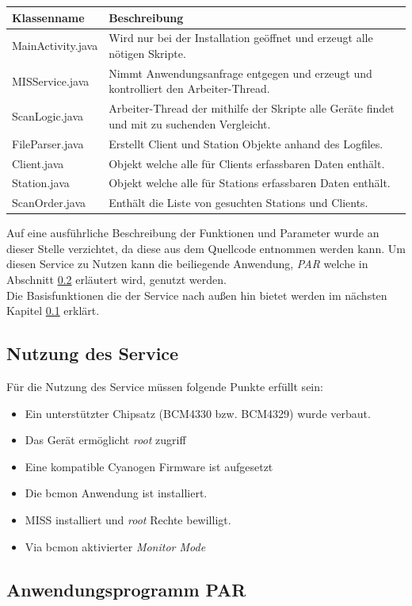 \documentclass[]{report}
\begin{document}
\begin{center}
  \begin{tabulary}{\textwidth}{l | L}
  \toprule
  Klassenname & Beschreibung \\
  \midrule
  MainActivity.java & Wird nur bei der Installation geöffnet und erzeugt alle nötigen Skripte.\\
  MISService.java & Nimmt Anwendungsanfrage entgegen und erzeugt und kontrolliert den Arbeiter-Thread. \\
  ScanLogic.java & Arbeiter-Thread der mithilfe der Skripte alle Geräte findet und mit zu suchenden Vergleicht. \\
  FileParser.java & Erstellt Client und Station Objekte anhand des Logfiles. \\
  Client.java & Objekt welche alle für Clients erfassbaren Daten enthält. \\
  Station.java & Objekt welche alle für Stations erfassbaren Daten enthält. \\ 
  ScanOrder.java & Enthält die Liste von gesuchten Stations und Clients. \\
  \bottomrule
  \end{tabulary}  
\end{center}
Auf eine ausführliche Beschreibung der Funktionen und Parameter wurde an dieser Stelle verzichtet, da diese aus dem Quellcode entnommen werden kann. Um diesen Service zu Nutzen kann die beiliegende Anwendung, \textit{PAR} welche in Abschnitt \ref{lab:par} erläutert wird, genutzt werden. \\
Die Basisfunktionen die der Service nach außen hin bietet werden im nächsten Kapitel \ref{lab:usage} erklärt. 
\subsection{Nutzung des Service}\label{lab:usage}
Für die Nutzung des Service müssen folgende Punkte erfüllt sein:
\begin{itemize}
\item Ein unterstützter Chipsatz (BCM4330 bzw. BCM4329) wurde verbaut.
\item Das Gerät ermöglicht \textit{root} zugriff
\item Eine kompatible Cyanogen Firmware ist aufgesetzt
\item Die bcmon Anwendung ist installiert.
\item MISS installiert und \textit{root} Rechte bewilligt.
\item Via bcmon aktivierter \textit{Monitor Mode}
\end{itemize}
\subsection{Anwendungsprogramm PAR}\label{lab:par}
\end{document}
